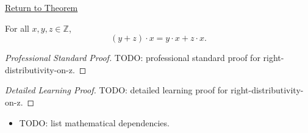 \newpage
{}
\label{prf:right-distributivity-on-z}

\begin{remark*}[Return]
\hyperref[cor:right-distributivity-on-z]{Return to Theorem}
\end{remark*}

\begin{corollary*}
For all $x,y,z\in\mathbb{Z}$,
\[
(y+z)\cdot x=y\cdot x+z\cdot x.
\]
\end{corollary*}

\begin{proof}[Professional Standard Proof]
\LRAProofBodyStart
TODO: professional standard proof for right-distributivity-on-z.
\end{proof}

\begin{proof}[Detailed Learning Proof]
\LRAProofBodyStart
TODO: detailed learning proof for right-distributivity-on-z.
\end{proof}

\begin{remark*}
\end{remark*}

\begin{dependencies}
\begin{itemize}
  \item TODO: list mathematical dependencies.
\end{itemize}
\end{dependencies}

\clearpage
